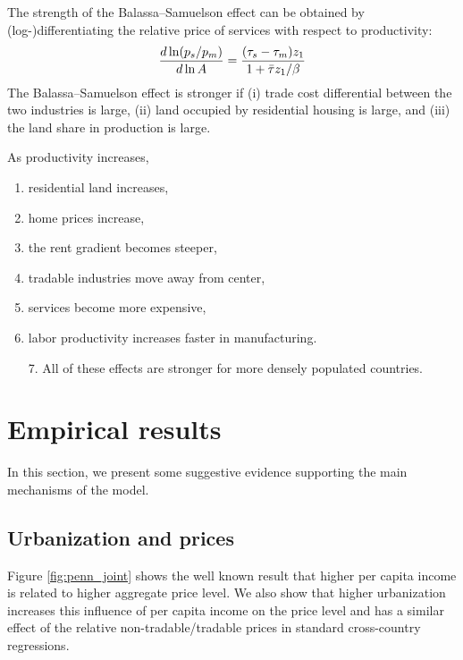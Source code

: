 \documentclass[12pt]{article}
\begin{document}
The strength of the Balassa--Samuelson effect can be obtained by (log-)differentiating the relative price of services with respect to productivity:
\[
\frac{d\ln (p_s/p_m)}{d\ln A} = \frac{(\tau_s-\tau_m)z_1}{1+\Bar\tau z_1/\beta}
\]
The Balassa--Samuelson effect is stronger if (i) trade cost differential between the two industries is large,       (ii) land occupied by residential housing is large, and (iii) the land share in production is large.
    


As productivity increases,
\begin{enumerate}
    \item residential land increases,
    \item home prices increase,
    \item the rent gradient becomes steeper,
	\item tradable industries move away from center,
    \item services become more expensive,
	\item labor productivity increases faster in manufacturing.
\end{enumerate}
\begin{enumerate}
	\item[7.] All of these effects are stronger for more densely populated countries.
\end{enumerate}





\section{Empirical results}\label{empirics}
In this section, we present some suggestive evidence supporting the
main mechanisms of the model.

\subsection{Urbanization and prices}
Figure \ref{fig:penn_joint} shows the well known result that higher
per capita income is related to higher aggregate price level. We also show that
higher urbanization increases this influence of per capita income on
the price level and has a similar effect of the relative
non-tradable/tradable prices in standard cross-country regressions.
\end{document}
